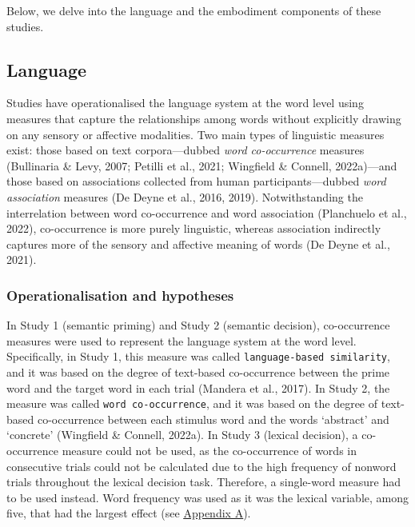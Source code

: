 \documentclass[
  12pt,
  man,floatsintext]{apa7}
\begin{document}
Below, we delve into the language and the embodiment components of these studies.

\hypertarget{language}{%
\subsection{Language}\label{language}}

Studies have operationalised the language system at the word level using measures that capture the relationships among words without explicitly drawing on any sensory or affective modalities. Two main types of linguistic measures exist: those based on text corpora---dubbed \emph{word co-occurrence} measures (Bullinaria \& Levy, 2007; Petilli et al., 2021; Wingfield \& Connell, 2022a)---and those based on associations collected from human participants---dubbed \emph{word association} measures (De Deyne et al., 2016, 2019). Notwithstanding the interrelation between word co-occurrence and word association (Planchuelo et al., 2022), co-occurrence is more purely linguistic, whereas association indirectly captures more of the sensory and affective meaning of words (De Deyne et al., 2021).

\hypertarget{operationalisation-and-hypotheses}{%
\subsubsection{Operationalisation and hypotheses}\label{operationalisation-and-hypotheses}}

In Study 1 (semantic priming) and Study 2 (semantic decision), co-occurrence measures were used to represent the language system at the word level. Specifically, in Study 1, this measure was called \texttt{language-based\ similarity}, and it was based on the degree of text-based co-occurrence between the prime word and the target word in each trial (Mandera et al., 2017). In Study 2, the measure was called \texttt{word\ co-occurrence}, and it was based on the degree of text-based co-occurrence between each stimulus word and the words `abstract' and `concrete' (Wingfield \& Connell, 2022a). In Study 3 (lexical decision), a co-occurrence measure could not be used, as the co-occurrence of words in consecutive trials could not be calculated due to the high frequency of nonword trials throughout the lexical decision task. Therefore, a single-word measure had to be used instead. Word frequency was used as it was the lexical variable, among five, that had the largest effect (see \protect\hyperlink{appendix-A-lexical-covariates}{\underline{Appendix A}}).
\end{document}
